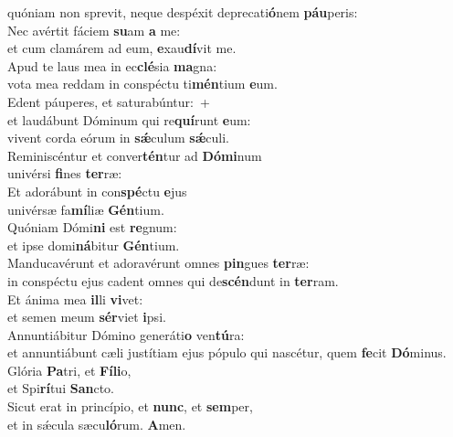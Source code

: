 \oddverse quóniam non sprevit, neque despéxit deprecati\textbf{ó}nem \textbf{páu}peris:\\
\evenverse Nec avértit fáciem \textbf{su}am \textbf{a} me:~\*\\
\evenverse et cum clamárem ad eum, \textbf{e}xau\textbf{dí}vit me.\\
\oddverse Apud te laus mea in ec\textbf{clé}sia \textbf{ma}gna:~\*\\
\oddverse vota mea reddam in conspéctu ti\textbf{mén}tium \textbf{e}um.\\
\evenverse Edent páuperes, et saturabúntur:~+\\
\evenverse  et laudábunt Dóminum qui re\textbf{quí}runt \textbf{e}um:~\*\\
\evenverse vivent corda eórum in \textbf{sǽ}culum \textbf{sǽ}culi.\\
\oddverse Reminiscéntur et conver\textbf{tén}tur ad \textbf{Dó}\textbf{mi}num~\*\\
\oddverse univérsi \textbf{fi}nes \textbf{ter}ræ:\\
\evenverse Et adorábunt in con\textbf{spé}ctu \textbf{e}jus~\*\\
\evenverse univérsæ fa\textbf{mí}liæ \textbf{Gén}tium.\\
\oddverse Quóniam Dómi\textbf{ni} est \textbf{re}gnum:~\*\\
\oddverse et ipse domi\textbf{ná}bitur \textbf{Gén}tium.\\
\evenverse Manducavérunt et adoravérunt omnes \textbf{pin}gues \textbf{ter}ræ:~\*\\
\evenverse in conspéctu ejus cadent omnes qui de\textbf{scén}dunt in \textbf{ter}ram.\\
\oddverse Et ánima mea \textbf{il}li \textbf{vi}vet:~\*\\
\oddverse et semen meum \textbf{sér}viet \textbf{i}psi.\\
\evenverse Annuntiábitur Dómino generáti\textbf{o} ven\textbf{tú}ra:~\*\\
\evenverse et annuntiábunt cæli justítiam ejus pópulo qui nascétur, quem \textbf{fe}cit \textbf{Dó}minus.\\
\oddverse Glória \textbf{Pa}tri, et \textbf{Fí}\textbf{li}o,~\*\\
\oddverse et Spi\textbf{rí}tui \textbf{San}cto.\\
\evenverse Sicut erat in princípio, et \textbf{nunc}, et \textbf{sem}per,~\*\\
\evenverse et in sǽcula sæcu\textbf{ló}rum. \textbf{A}men.\\
